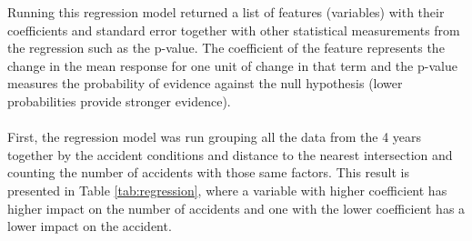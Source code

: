 Running this regression model returned a list of features (variables) with their coefficients and standard error together with other statistical measurements from the regression such as the p-value. The coefficient of the feature represents the change in the mean response for one unit of change in that term and the p-value measures the probability of evidence against the null hypothesis (lower probabilities provide stronger evidence). 
\\
\\
First, the regression model was run grouping all the data from the 4 years together by the accident conditions and distance to the nearest intersection and counting the number of accidents with those same factors. This result is presented in Table \ref{tab:regression}, where a variable with higher coefficient has higher impact on the number of accidents and one with the lower coefficient has a lower impact on the accident. 
\\
